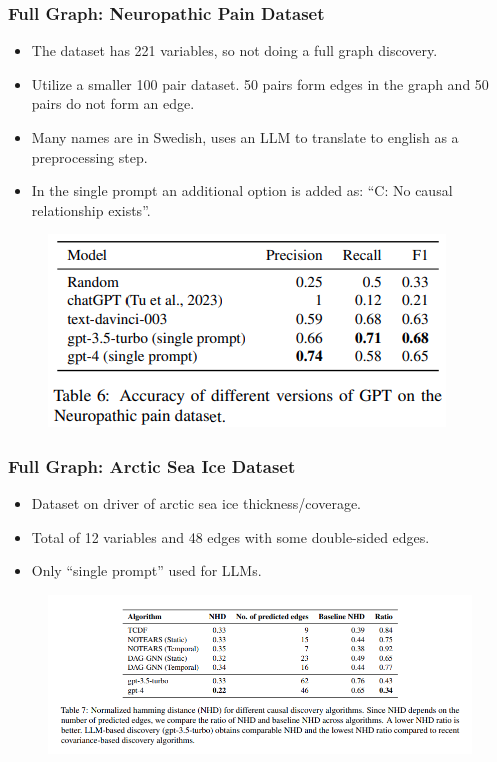 \documentclass{beamer}
\begin{document}
\begin{frame}
	\frametitle{Full Graph: Neuropathic Pain Dataset}
	\begin{itemize}
		\item The dataset has 221 variables, so not doing a full graph discovery.
		\item Utilize a smaller 100 pair dataset. 50 pairs form edges in the graph and 50 pairs do not form an edge.
		\item Many names are in Swedish, uses an LLM to translate to english as a preprocessing step.
		\item In the single prompt an additional option is added as: ``C: No causal relationship exists''.
	\end{itemize}
	\begin{figure}
		\includegraphics[scale=0.4]{imgs/table6.png}
	\end{figure}
\end{frame}

\begin{frame}
	\frametitle{Full Graph: Arctic Sea Ice Dataset}
	\begin{itemize}
		\item Dataset on driver of arctic sea ice thickness/coverage.
		\item Total of 12 variables and 48 edges with some double-sided edges.
		\item Only ``single prompt'' used for LLMs.
	\end{itemize}
	\begin{figure}
		\includegraphics[scale=0.4]{imgs/table7.png}
	\end{figure}
\end{frame}
\end{document}
